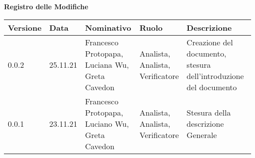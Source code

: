 {\LARGE{\textbf{Registro delle Modifiche}}} \\
\renewcommand{\arraystretch}{2}
\begin{tabular}{|m{}<{\centering}|m{}<{\centering}|m{}<{\centering}|m{}<{\centering}|m{}<{\centering}|}
	\hline \rowcolor{azzurro_scuro!70}
	\textbf{Versione}&\textbf{Data}&\textbf{Nominativo}&\textbf{Ruolo}&\textbf{Descrizione}\\
	\hline
	0.0.2&25.11.21&\shortstack {Francesco Protopapa,\\Luciana Wu,\\Greta Cavedon}&\shortstack{Analista,\\Analista,\\Verificatore}&Creazione del documento, stesura dell’introduzione del documento\\ 
	\hline \rowcolor{azzurro_chiaro!30}
	0.0.1&23.11.21&\shortstack{Francesco Protopapa,\\Luciano Wu,\\Greta Cavedon}&\shortstack{Analista,\\Analista,\\Verificatore}&Stesura della descrizione Generale\\
	\hline
\end{tabular}